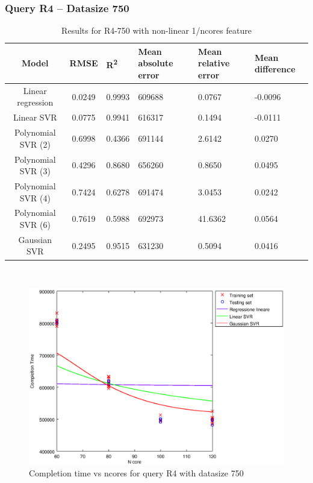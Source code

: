 \documentclass[a4paper,11pt]{article}
\begin{document}
\newpage
\subsubsection{Query R4 -- Datasize 750}
\begin{table}[H]
	\centering
	\begin{adjustbox}{center}
		\begin{tabular}{c | c M{1.2cm} M{2.5cm} M{2.5cm} M{1.8cm}}
			Model & RMSE & R\textsuperscript{2} & Mean absolute error & Mean relative error & Mean difference \tabularnewline
			\hline
			Linear regression & 0.0249 & 0.9993 & 609688 & 0.0767 & -0.0096 \\
			Linear SVR & 0.0775 & 0.9941 & 616317 & 0.1494 & -0.0111 \\
			Polynomial SVR (2) & 0.6998 & 0.4366 & 691144 & 2.6142 & 0.0270 \\
			Polynomial SVR (3) & 0.4296 & 0.8680 & 656260 & 0.8650 & 0.0495 \\
			Polynomial SVR (4) & 0.7424 & 0.6278 & 691474 & 3.0453 & 0.0242 \\
			Polynomial SVR (6) & 0.7619 & 0.5988 & 692973 & 41.6362 & 0.0564 \\
			Gaussian SVR & 0.2495 & 0.9515 & 631230 & 0.5094 & 0.0416 \\
		\end{tabular}
	\end{adjustbox}
	\\
	\caption{Results for R4-750 with non-linear 1/ncores feature}
	\label{table_R4_prediction_all}
\end{table}

\begin {figure}[hbtp]
\centering
\includegraphics[width=\textwidth]{output/R4_750_1_OVER_NCORES/plot_R4_750_bestmodels.eps}
\caption {Completion time vs ncores for query R4 with datasize 750}
\end {figure}
\end{document}
